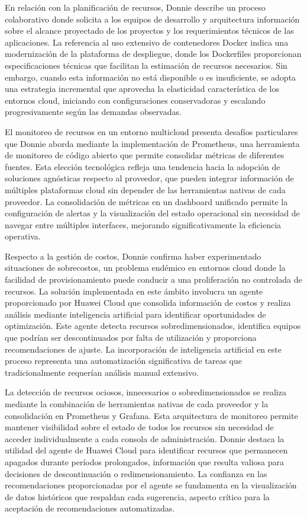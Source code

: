 En relación con la planificación de recursos, Donnie describe un proceso colaborativo donde solicita a los equipos de desarrollo y arquitectura información sobre el alcance proyectado de los proyectos y los requerimientos técnicos de las aplicaciones. La referencia al uso extensivo de contenedores Docker indica una modernización de la plataforma de despliegue, donde los Dockerfiles proporcionan especificaciones técnicas que facilitan la estimación de recursos necesarios. Sin embargo, cuando esta información no está disponible o es insuficiente, se adopta una estrategia incremental que aprovecha la elasticidad característica de los entornos cloud, iniciando con configuraciones conservadoras y escalando progresivamente según las demandas observadas.

El monitoreo de recursos en un entorno multicloud presenta desafíos particulares que Donnie aborda mediante la implementación de Prometheus, una herramienta de monitoreo de código abierto que permite consolidar métricas de diferentes fuentes. Esta elección tecnológica refleja una tendencia hacia la adopción de soluciones agnósticas respecto al proveedor, que pueden integrar información de múltiples plataformas cloud sin depender de las herramientas nativas de cada proveedor. La consolidación de métricas en un dashboard unificado permite la configuración de alertas y la visualización del estado operacional sin necesidad de navegar entre múltiples interfaces, mejorando significativamente la eficiencia operativa.

Respecto a la gestión de costos, Donnie confirma haber experimentado situaciones de sobrecostos, un problema endémico en entornos cloud donde la facilidad de provisionamiento puede conducir a una proliferación no controlada de recursos. La solución implementada en este ámbito involucra un agente proporcionado por Huawei Cloud que consolida información de costos y realiza análisis mediante inteligencia artificial para identificar oportunidades de optimización. Este agente detecta recursos sobredimensionados, identifica equipos que podrían ser descontinuados por falta de utilización y proporciona recomendaciones de ajuste. La incorporación de inteligencia artificial en este proceso representa una automatización significativa de tareas que tradicionalmente requerían análisis manual extensivo.

La detección de recursos ociosos, innecesarios o sobredimensionados se realiza mediante la combinación de herramientas nativas de cada proveedor y la consolidación en Prometheus y Grafana. Esta arquitectura de monitoreo permite mantener visibilidad sobre el estado de todos los recursos sin necesidad de acceder individualmente a cada consola de administración. Donnie destaca la utilidad del agente de Huawei Cloud para identificar recursos que permanecen apagados durante períodos prolongados, información que resulta valiosa para decisiones de descontinuación o redimensionamiento. La confianza en las recomendaciones proporcionadas por el agente se fundamenta en la visualización de datos históricos que respaldan cada sugerencia, aspecto crítico para la aceptación de recomendaciones automatizadas.

